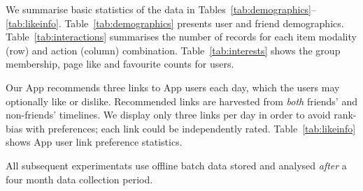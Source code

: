 
We summarise basic statistics of the data in
Tables~\ref{tab:demographics}--\ref{tab:likeinfo}.
Table~\ref{tab:demographics} presents user and friend demographics.
Table~\ref{tab:interactions} summarises the number of
records for each item modality (row) and action (column)
combination. Table~\ref{tab:interests} shows the group membership,
page like and favourite counts for users.

Our App recommends three links to App users each day,
which the users may optionally like or dislike.  Recommended links are
harvested from
\emph{both} friends' and non-friends' timelines.
We display only three links per day in order to avoid rank-bias with
preferences; each link could be independently rated.
Table~\ref{tab:likeinfo} shows App user
link preference statistics.

All subsequent experimentats use offline
batch data stored and analysed \emph{after} a four
month data collection period.
      							
